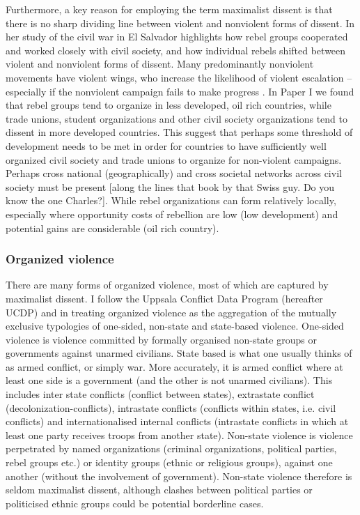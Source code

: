 Furthermore, a key reason for employing the term maximalist dissent is that
there is no sharp dividing line between violent and nonviolent forms of dissent.
In her study of the civil war in El Salvador \citet{Wood2003} highlights how
rebel groups cooperated and worked closely with civil society, and how individual
rebels shifted between violent and nonviolent forms of dissent. Many predominantly
nonviolent movements have violent wings, who increase the likelihood of
violent escalation -- especially if the nonviolent campaign fails to make
progress \citep{Ryckman_2019}. In Paper I we found that rebel groups tend to
organize in less developed, oil rich countries, while trade unions, student organizations
and other civil society organizations tend to dissent in more developed
countries. This suggest that perhaps some threshold of development needs to be
met in order for countries to have sufficiently well organized civil society and
trade unions to organize for non-violent campaigns. Perhaps cross national
(geographically) and cross societal networks across civil society must be
present [along the lines that book by that Swiss guy. Do you know the one
Charles?]. While rebel organizations can form relatively locally, especially
where opportunity costs of rebellion are low (low development) and potential
gains are considerable (oil rich country).

\subsubsection{Organized violence}
\label{Organized violence}

There are many forms of organized violence, most of which are captured by
maximalist dissent. I follow the Uppsala Conflict Data Program (hereafter UCDP)
and \citet{Melander_2016} in treating organized violence as the aggregation of
the mutually exclusive typologies of one-sided, non-state and state-based
violence. One-sided violence is violence committed by formally organised
non-state groups or governments against unarmed civilians. State based is what
one usually thinks of as armed conflict, or simply war. More accurately, it is
armed conflict where at least one side is a government (and the other is not
unarmed civilians). This includes inter state conflicts (conflict between
states), extrastate conflict (decolonization-conflicts), intrastate conflicts
(conflicts within states, i.e. civil conflicts) and internationalised internal
conflicts (intrastate conflicts in which at least one party receives troops from
another state). Non-state violence is violence perpetrated by named
organizations (criminal organizations, political parties, rebel groups etc.) or
identity groups (ethnic or religious groups), against one another (without the
involvement of government). Non-state violence therefore is seldom 
maximalist dissent, although clashes between political parties or politicised
ethnic groups could be potential borderline cases.

